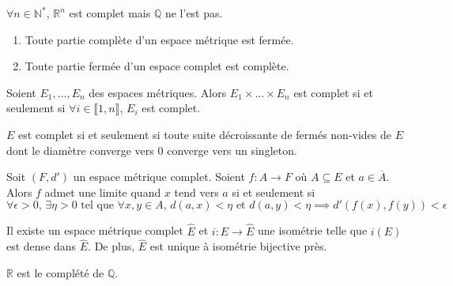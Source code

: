 	\begin{example}
		$\forall n \in \mathbb{N}^*$, $\mathbb{R}^n$ est complet mais $\mathbb{Q}$ ne l'est pas.
	\end{example}

	\begin{proposition}
		\begin{enumerate}[label=(\roman*)]
			\item Toute partie complète d'un espace métrique est fermée.
			\item Toute partie fermée d'un espace complet est complète.
		\end{enumerate}
	\end{proposition}

	\begin{proposition}
		Soient $E_1, \dots, E_n$ des espaces métriques. Alors $E_1 \times \dots \times E_n$ est complet si et seulement si $\forall i \in \llbracket 1, n \rrbracket$, $E_i$ est complet.
	\end{proposition}

	\begin{proposition}
		$E$ est complet si et seulement si toute suite décroissante de fermés non-vides de $E$ dont le diamètre converge vers $0$ converge vers un singleton.
	\end{proposition}

	\begin{proposition}
		Soit $(F, d')$ un espace métrique complet. Soient $f : A \rightarrow F$ où $A \subseteq E$ et $a \in \overline{A}$. Alors $f$ admet une limite quand $x$ tend vers $a$ si et seulement si
		\[ \forall \epsilon > 0, \, \exists \eta > 0 \text{ tel que } \forall x, y \in A, \, d(a,x) < \eta \text{ et } d(a,y) < \eta \implies d'(f(x), f(y)) < \epsilon \]
	\end{proposition}


	\begin{theorem}
		Il existe un espace métrique complet $\widehat{E}$ et $i : E \rightarrow \widehat{E}$ une isométrie telle que $i(E)$ est dense dans $\widehat{E}$. De plus, $\widehat{E}$ est unique à isométrie bijective près.
	\end{theorem}

	\begin{example}
		$\mathbb{R}$ est le complété de $\mathbb{Q}$.
	\end{example}

